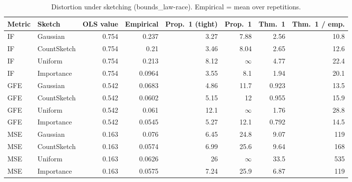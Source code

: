\begin{table}[t]
\centering
\small
\begin{tabular}{llrrrrrr}
\toprule
Metric & Sketch & OLS value & Empirical & Prop.~1 (tight) & Prop.~1 & Thm.~1 & Thm.~1 / emp. \\
\midrule
IF & Gaussian & 0.754 & 0.237 & 3.27 & 7.88 & 2.56 & 10.8 \\
IF & CountSketch & 0.754 & 0.21 & 3.46 & 8.04 & 2.65 & 12.6 \\
IF & Uniform & 0.754 & 0.213 & 8.12 & $\infty$ & 4.77 & 22.4 \\
IF & Importance & 0.754 & 0.0964 & 3.55 & 8.1 & 1.94 & 20.1 \\
\midrule
GFE & Gaussian & 0.542 & 0.0683 & 4.86 & 11.7 & 0.923 & 13.5 \\
GFE & CountSketch & 0.542 & 0.0602 & 5.15 & 12 & 0.955 & 15.9 \\
GFE & Uniform & 0.542 & 0.061 & 12.1 & $\infty$ & 1.76 & 28.8 \\
GFE & Importance & 0.542 & 0.0545 & 5.27 & 12.1 & 0.792 & 14.5 \\
\midrule
MSE & Gaussian & 0.163 & 0.076 & 6.45 & 24.8 & 9.07 & 119 \\
MSE & CountSketch & 0.163 & 0.0574 & 6.99 & 25.6 & 9.64 & 168 \\
MSE & Uniform & 0.163 & 0.0626 & 26 & $\infty$ & 33.5 & 535 \\
MSE & Importance & 0.163 & 0.0575 & 7.24 & 25.9 & 6.87 & 119 \\
\bottomrule
\end{tabular}
\caption{Distortion under sketching (bounds_law-race). Empirical = mean over repetitions.}
\label{tab:bounds_law-race}
\end{table}